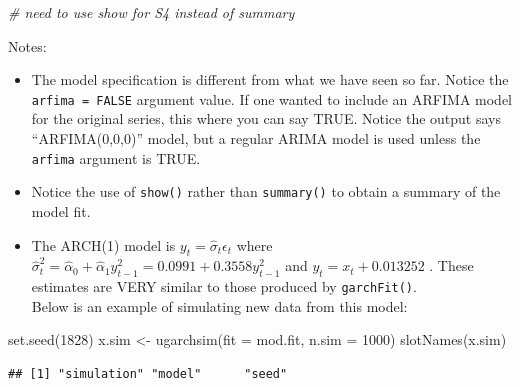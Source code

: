 \documentclass[
]{book}
\newenvironment{Shaded}{\begin{snugshade}}{\end{snugshade}}
\newcommand{\AttributeTok}[1]{\textcolor[rgb]{0.77,0.63,0.00}{#1}}
\newcommand{\CommentTok}[1]{\textcolor[rgb]{0.56,0.35,0.01}{\textit{#1}}}
\newcommand{\DecValTok}[1]{\textcolor[rgb]{0.00,0.00,0.81}{#1}}
\newcommand{\FunctionTok}[1]{\textcolor[rgb]{0.00,0.00,0.00}{#1}}
\newcommand{\NormalTok}[1]{#1}
\newcommand{\OtherTok}[1]{\textcolor[rgb]{0.56,0.35,0.01}{#1}}
\newcommand{\SpecialCharTok}[1]{\textcolor[rgb]{0.00,0.00,0.00}{#1}}
\providecommand{\tightlist}{%
  \setlength{\itemsep}{0pt}\setlength{\parskip}{0pt}}
\theoremstyle{definition}
\theoremstyle{definition}
\theoremstyle{definition}
\theoremstyle{definition}
\theoremstyle{remark}
\begin{document}
\begin{Shaded}
\begin{Highlighting}[]
\CommentTok{\# need to use show for S4 instead of summary}
\end{Highlighting}
\end{Shaded}

Notes:

\begin{itemize}
\tightlist
\item
  The model specification is different from what we have seen so far. Notice the \texttt{arfima\ =\ FALSE} argument value. If one wanted to include an ARFIMA model for the original series, this where you can say TRUE. Notice the output says ``ARFIMA(0,0,0)'' model, but a regular ARIMA model is used unless the \texttt{arfima} argument is TRUE.
\item
  Notice the use of \texttt{show()} rather than \texttt{summary()} to obtain a summary of the model fit.
\item
  The ARCH(1) model is \(y_t = \hat \sigma_t\epsilon_t\) where \(\hat \sigma_t^2=\hat \alpha_0+\hat \alpha_1y^2_{t-1}=0.0991+0.3558y^2_{t-1}\) and \(y_t=x_t+0.013252\) . These estimates are VERY similar to those produced by \texttt{garchFit()}.\\
  Below is an example of simulating new data from this model:
\end{itemize}

\begin{Shaded}
\begin{Highlighting}[]
\FunctionTok{set.seed}\NormalTok{(}\DecValTok{1828}\NormalTok{)}
\NormalTok{x.sim }\OtherTok{\textless{}{-}} \FunctionTok{ugarchsim}\NormalTok{(}\AttributeTok{fit =}\NormalTok{ mod.fit, }\AttributeTok{n.sim =} \DecValTok{1000}\NormalTok{)}
\FunctionTok{slotNames}\NormalTok{(x.sim)}
\end{Highlighting}
\end{Shaded}

\begin{verbatim}
## [1] "simulation" "model"      "seed"
\end{verbatim}

\begin{Shaded}
\end{Shaded}
\end{document}
